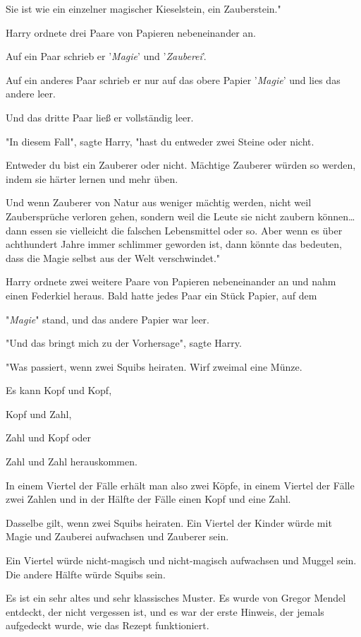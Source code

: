 {Sie ist wie ein einzelner magischer Kieselstein, ein Zauberstein."

Harry ordnete drei Paare von Papieren nebeneinander an.

Auf ein Paar schrieb er '\emph{Magie}' und '\emph{Zauberei}'.

Auf ein anderes Paar schrieb er nur auf das obere Papier '\emph{Magie}' und lies das andere leer.

Und das dritte Paar ließ er vollständig leer.

"In diesem Fall", sagte Harry, "hast du entweder zwei Steine oder nicht.

Entweder du bist ein Zauberer oder nicht. Mächtige Zauberer würden so werden, indem sie härter lernen und mehr üben.

Und wenn Zauberer von Natur aus weniger mächtig werden, nicht weil Zaubersprüche verloren gehen, sondern weil die Leute sie nicht zaubern können… dann essen sie vielleicht die falschen Lebensmittel oder so. Aber wenn es über achthundert Jahre immer schlimmer geworden ist, dann könnte das bedeuten, dass die Magie selbst aus der Welt verschwindet."

Harry ordnete zwei weitere Paare von Papieren nebeneinander an und nahm einen Federkiel heraus. Bald hatte jedes Paar ein Stück Papier, auf dem

"\emph{Magie}" stand, und das andere Papier war leer.

"Und das bringt mich zu der Vorhersage", sagte Harry.

"Was passiert, wenn zwei Squibs heiraten. Wirf zweimal eine Münze.

Es kann Kopf und Kopf,

Kopf und Zahl,

Zahl und Kopf oder

Zahl und Zahl herauskommen.

In einem Viertel der Fälle erhält man also zwei Köpfe, in einem Viertel der Fälle zwei Zahlen und in der Hälfte der Fälle einen Kopf und eine Zahl.

Dasselbe gilt, wenn zwei Squibs heiraten. Ein Viertel der Kinder würde mit Magie und Zauberei aufwachsen und Zauberer sein.

Ein Viertel würde nicht-magisch und nicht-magisch aufwachsen und Muggel sein. Die andere Hälfte würde Squibs sein.

Es ist ein sehr altes und sehr klassisches Muster. Es wurde von Gregor Mendel entdeckt, der nicht vergessen ist, und es war der erste Hinweis, der jemals aufgedeckt wurde, wie das Rezept funktioniert.

}
